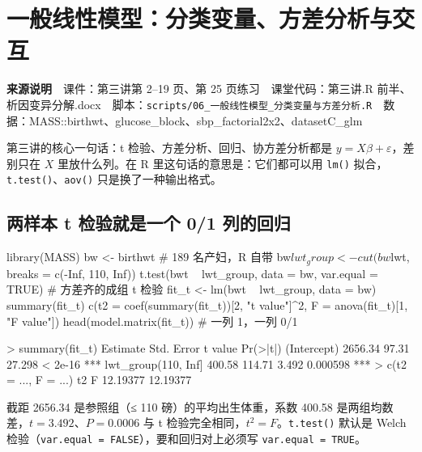 \chapter{一般线性模型：分类变量、方差分析与交互}

\begin{studysource}
\textbf{来源说明}　课件：第三讲第 2–19 页、第 25 页练习　课堂代码：第三讲.R 前半、析因变异分解.docx　脚本：\texttt{scripts/06\_一般线性模型\_分类变量与方差分析.R}　数据：MASS::birthwt、glucose\_block、sbp\_factorial2x2、datasetC\_glm
\end{studysource}


第三讲的核心一句话：t 检验、方差分析、回归、协方差分析都是 $y=X\beta+\varepsilon$，差别只在 $X$ 里放什么列。在 R 里这句话的意思是：它们都可以用 \Verb|lm()| 拟合，\Verb|t.test()|、\Verb|aov()| 只是换了一种输出格式。

\section{两样本 t 检验就是一个 0/1 列的回归}
\begin{rcode}
library(MASS)
bw <- birthwt                                          # 189 名产妇，R 自带
bw$lwt_group <- cut(bw$lwt, breaks = c(-Inf, 110, Inf))
t.test(bwt ~ lwt_group, data = bw, var.equal = TRUE)    # 方差齐的成组 t 检验
fit_t <- lm(bwt ~ lwt_group, data = bw)
summary(fit_t)
c(t2 = coef(summary(fit_t))[2, "t value"]^2, F = anova(fit_t)[1, "F value"])
head(model.matrix(fit_t))                              # 一列 1，一列 0/1
\end{rcode}
\begin{routput}
> summary(fit_t)
                    Estimate Std. Error t value Pr(>|t|)
(Intercept)          2656.34      97.31  27.298  < 2e-16 ***
lwt_group(110, Inf]   400.58     114.71   3.492 0.000598 ***
> c(t2 = ..., F = ...)
      t2        F
12.19377 12.19377
\end{routput}
截距 2656.34 是参照组（≤ 110 磅）的平均出生体重，系数 400.58 是两组均数差，$t=3.492$、$P=0.0006$ 与 t 检验完全相同，$t^2=F$。\Verb|t.test()| 默认是 Welch 检验（\Verb|var.equal = FALSE|），要和回归对上必须写 \Verb|var.equal = TRUE|。


